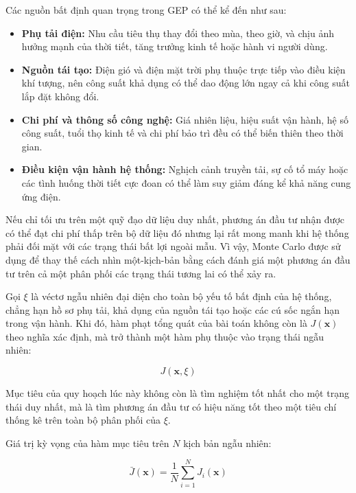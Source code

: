 Các nguồn bất định quan trọng trong GEP có thể kể đến như sau:
\begin{itemize}
    \item \textbf{Phụ tải điện:} Nhu cầu tiêu thụ thay đổi theo mùa, theo giờ, và chịu ảnh hưởng mạnh của thời tiết, tăng trưởng kinh tế hoặc hành vi người dùng.
    \item \textbf{Nguồn tái tạo:} Điện gió và điện mặt trời phụ thuộc trực tiếp vào điều kiện khí tượng, nên công suất khả dụng có thể dao động lớn ngay cả khi công suất lắp đặt không đổi.
    \item \textbf{Chi phí và thông số công nghệ:} Giá nhiên liệu, hiệu suất vận hành, hệ số công suất, tuổi thọ kinh tế và chi phí bảo trì đều có thể biến thiên theo thời gian.
    \item \textbf{Điều kiện vận hành hệ thống:} Nghịch cảnh truyền tải, sự cố tổ máy hoặc các tình huống thời tiết cực đoan có thể làm suy giảm đáng kể khả năng cung ứng điện.
\end{itemize}

Nếu chỉ tối ưu trên một quỹ đạo dữ liệu duy nhất, phương án đầu tư nhận được có thể đạt chi phí thấp trên bộ dữ liệu đó nhưng lại rất mong manh khi hệ thống phải đối mặt với các trạng thái bất lợi ngoài mẫu. Vì vậy, Monte Carlo được sử dụng để thay thế cách nhìn một-kịch-bản bằng cách đánh giá một phương án đầu tư trên cả một phân phối các trạng thái tương lai có thể xảy ra.

Gọi $\xi$ là véctơ ngẫu nhiên đại diện cho toàn bộ yếu tố bất định của hệ thống, chẳng hạn hồ sơ phụ tải, khả dụng của nguồn tái tạo hoặc các cú sốc ngắn hạn trong vận hành. Khi đó, hàm phạt tổng quát của bài toán không còn là $J(\mathbf{x})$ theo nghĩa xác định, mà trở thành một hàm phụ thuộc vào trạng thái ngẫu nhiên:

\begin{equation}
    J(\mathbf{x}, \xi)
\end{equation}

Mục tiêu của quy hoạch lúc này không còn là tìm nghiệm tốt nhất cho một trạng thái duy nhất, mà là tìm phương án đầu tư có hiệu năng tốt theo một tiêu chí thống kê trên toàn bộ phân phối của $\xi$.

Giá trị kỳ vọng của hàm mục tiêu trên $N$ kịch bản ngẫu nhiên:

\begin{equation}
    \bar{J}(\mathbf{x}) = \frac{1}{N} \sum_{i=1}^{N} J_i(\mathbf{x})
    \label{eq:monte_carlo}
\end{equation}

